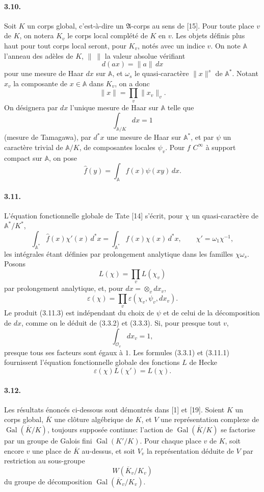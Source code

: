 \documentclass[10pt]{article}
\newcommand{\Gal}{\operatorname{Gal}}
\providecommand{\Gal}{\operatorname{Gal}}
\providecommand{\Gal}{\operatorname{Gal}}
\providecommand{\Gal}{\operatorname{Gal}}
\providecommand{\Gal}{\operatorname{Gal}}
\begin{document}
\paragraph{3.10.} Soit \(K\) un corps global, c'est-à-dire un \(\mathfrak A\)-corps au sens de [15]. Pour toute place \(v\) de \(K\), on notera \(K_v\) le corps local complété de \(K\) en \(v\). Les objets définis plus haut pour tout corps local seront, pour \(K_v\), notés avec un indice \(v\). On note \(\mathbb A\) l'anneau des adèles de \(K\), \(\|\ \|\) la valeur absolue vérifiant
\[
d(ax)=\|a\|\,dx
\]
pour une mesure de Haar \(dx\) sur \(\mathbb A\), et \(\omega_s\) le quasi-caractère \(\|x\|^s\) de \(\mathbb A^*\). Notant \(x_v\) la composante de \(x\in\mathbb A\) dans \(K_v\), on a donc
\[
\|x\|=\prod_v\|x_v\|_v.
\]
On désignera par \(dx\) l'unique mesure de Haar sur \(\mathbb A\) telle que
\[
\int_{\mathbb A/K}dx=1
\]
(mesure de Tamagawa), par \(d^*x\) une mesure de Haar sur \(\mathbb A^*\), et par \(\psi\) un caractère trivial de \(\mathbb A/K\), de composantes locales \(\psi_v\). Pour \(f\) \(C^\infty\) à support compact sur \(\mathbb A\), on pose
\[
\widehat f(y)=\int_{\mathbb A}f(x)\psi(xy)\,dx.
\]


\newpage

\paragraph{3.11.} L'équation fonctionnelle globale de Tate [14] s'écrit, pour \(\chi\) un quasi-caractère de \(\mathbb A^*/K^*\),
\[
\tag{3.11.1}
\int_{\mathbb A^*}\widehat f(x)\chi'(x)\,d^*x
=
\int_{\mathbb A^*}f(x)\chi(x)\,d^*x,
\qquad
\chi'=\omega_1\chi^{-1},
\]
les intégrales étant définies par prolongement analytique dans les familles \(\chi\omega_s\). Posons
\[
\tag{3.11.2}
L(\chi)=\prod_v L(\chi_v)
\]
par prolongement analytique, et, pour \(dx=\otimes_v dx_v\),
\[
\tag{3.11.3}
\varepsilon(\chi)=\prod_v\varepsilon(\chi_v,\psi_v,dx_v).
\]
Le produit (3.11.3) est indépendant du choix de \(\psi\) et de celui de la décomposition de \(dx\), comme on le déduit de (3.3.2) et (3.3.3). Si, pour presque tout \(v\),
\[
\int_{\mathcal O_v}dx_v=1,
\]
presque tous ses facteurs sont égaux à \(1\). Les formules (3.3.1) et (3.11.1) fournissent l'équation fonctionnelle globale des fonctions \(L\) de Hecke
\[
\tag{3.11.4}
\varepsilon(\chi)L(\chi')=L(\chi).
\]


\newpage

\paragraph{3.12.} Les résultats énoncés ci-dessous sont démontrés dans [1] et [19]. Soient \(K\) un corps global, \(\overline K\) une clôture algébrique de \(K\), et \(V\) une représentation complexe de \(\Gal(\overline K/K)\), toujours supposée continue: l'action de \(\Gal(\overline K/K)\) se factorise par un groupe de Galois fini \(\Gal(K'/K)\). Pour chaque place \(v\) de \(K\), soit encore \(v\) une place de \(\overline K\) au-dessus, et soit \(V_v\) la représentation déduite de \(V\) par restriction au sous-groupe
\[
W(\overline K_v/K_v)
\]
du groupe de décomposition \(\Gal(\overline K_v/K_v)\).
\end{document}
